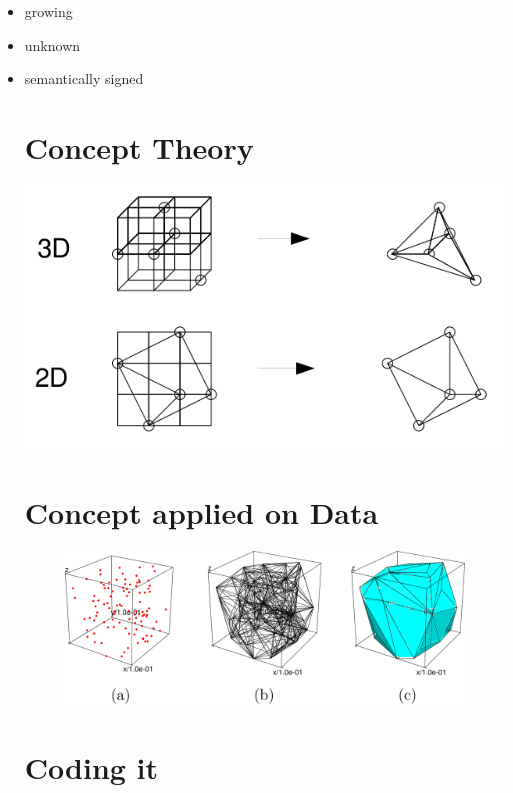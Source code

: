 \documentclass[11pt]{article}
\begin{document}
\begin{itemize}

\label{item any mix of states}
\item growing
\item unknown
\item semantically signed



\section{Concept Theory}

\includegraphics[scale=0.65]{image/research-base-002.png}



\section{Concept applied on Data}
\begin{figure}[htp]
\includegraphics[scale=0.32]{image/research-base-001.png}
\end{figure}



\section{Coding it}


\end{itemize}
\end{document}
